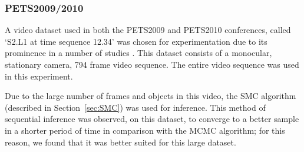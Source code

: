 \documentclass[twocolumn, final]{svjour3}
\begin{document}





\subsubsection{PETS2009/2010}

A video dataset used in both the PETS2009 and PETS2010 conferences, called `S2.L1 at time sequence 12.34' was chosen for experimentation due to its prominence in a number of studies \cite{ellis_2010}.
This dataset consists of a monocular, stationary camera, 794 frame video sequence. The entire video sequence was used in this experiment. 

Due to the large number of frames and objects in this video, the SMC algorithm (described in Section~\ref{sec:SMC}) was used for inference. This method of sequential inference was observed, on this dataset, to converge to a better sample in a shorter period of time in comparison with the MCMC algorithm; for this reason, we found that it was better suited for this large dataset.
\end{document}
